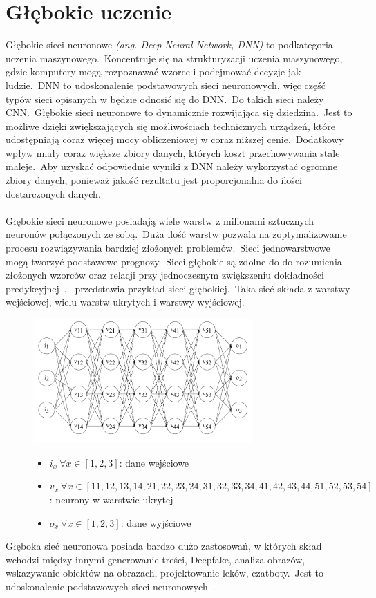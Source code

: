 \section{Głębokie uczenie}
\label{sec:deeplearn}
Głębokie sieci neuronowe \textit{(ang. Deep Neural Network, DNN)} to podkategoria uczenia maszynowego.\ Koncentruje się na strukturyzacji uczenia maszynowego, gdzie komputery mogą rozpoznawać wzorce i podejmować decyzje jak ludzie.\ DNN to udoskonalenie podstawowych sieci neuronowych, więc część typów sieci opisanych w  będzie odnosić się do DNN.\ Do takich sieci należy CNN.\ Głębokie sieci neuronowe to dynamicznie rozwijająca się dziedzina.\ Jest to możliwe dzięki zwiększających się możliwościach technicznych urządzeń, które udostępniają coraz więcej mocy obliczeniowej w coraz niższej cenie.\ Dodatkowy wpływ miały coraz większe zbiory danych, których koszt przechowywania stale maleje.\ Aby uzyskać odpowiednie wyniki z DNN należy wykorzystać ogromne zbiory danych, ponieważ jakość rezultatu jest proporcjonalna do ilości dostarczonych danych.
\\ \\
Głębokie sieci neuronowe posiadają wiele warstw z milionami sztucznych neuronów połączonych ze sobą.\ Duża ilość warstw pozwala na zoptymalizowanie procesu rozwiązywania bardziej złożonych problemów.\ Sieci jednowarstwowe mogą tworzyć podstawowe prognozy.\ Sieci głębokie są zdolne do do rozumienia złożonych wzorców oraz relacji przy jednoczesnym zwiększeniu dokładności predykcyjnej~\cite{Crabtree}.\  przedstawia przykład sieci głębokiej.\ Taka sieć składa z warstwy wejściowej, wielu warstw ukrytych i warstwy wyjściowej.

\begin{figure}[H]
    \centering
    \includegraphics[width=0.75\textwidth]{images/deep-neural-network}
    \begin{itemize}
        \item[] $i_x \  \forall x \in [1, 2, 3]$: dane wejściowe
        \item[] $v_x \ \forall x \in [11, 12, 13, 14, 21, 22, 23, 24, 31, 32, 33, 34, 41, 42, 43, 44, 51, 52, 53, 54]$: neurony w warstwie ukrytej
        \item[] $o_x \ \forall x \in [1, 2, 3]$: dane wyjściowe
    \end{itemize}
    \label{fig:deep-learn}
\end{figure}

Głęboka sieć neuronowa posiada bardzo dużo zastosowań, w których skład wchodzi między innymi generowanie treści, Deepfake, analiza obrazów, wskazywanie obiektów na obrazach, projektowanie leków, czatboty.\ Jest to udoskonalenie podstawowych sieci neuronowych~\cite{MicrosoftDeep2023}.
